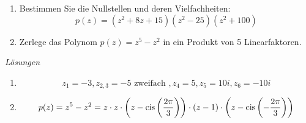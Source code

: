 \begin{ueb}
    {}{}
    \begin{enumerate}

        \item Bestimmen Sie die Nullstellen und deren Vielfachheiten:
        \[
        p(z) = (z^2 + 8z + 15)(z^2 - 25)(z^2 + 100)
        \]
    
        \item Zerlege das Polynom \( p(z) = z^5 - z^2 \) in ein Produkt von 5 Linearfaktoren.
    
    
       
    
    \end{enumerate}
\end{ueb}

\clearpage
\emph{Lösungen}
\begin{enumerate}
    \item 
        $$z_1=-3, z_{2,3}=-5 \text{ zweifach } , z_4=5  ,  z_5 = 10i, z_6=-10i $$
    \item $$ p(z) = z^5 - z^2= z\cdot z \cdot\left(z-\mathrm{cis}\left(\frac{2\pi}{3}\right)\right)\cdot(z-1)\cdot\left(z-\mathrm{cis}\left(-\frac{2\pi}{3}\right)\right)$$ 

  
\end{enumerate}
